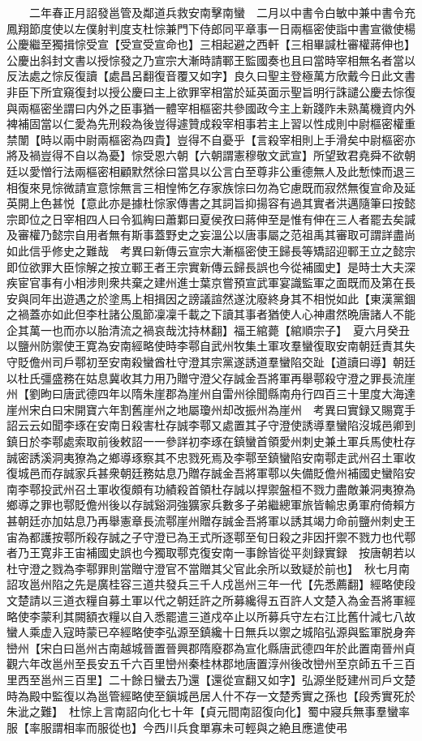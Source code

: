 　　二年春正月詔發邕管及鄰道兵救安南擊南蠻　二月以中書令白敏中兼中書令充鳳翔節度使以左僕射判度支杜悰兼門下侍郎同平章事一日兩樞密使詣中書宣徽使楊公慶繼至獨揖悰受宣【受宣受宣命也】三相起避之西軒【三相畢諴杜審權蔣伸也】公慶出斜封文書以授悰發之乃宣宗大漸時請鄆王監國奏也且曰當時宰相無名者當以反法處之悰反復讀【處昌呂翻復音覆又如字】良久曰聖主登極萬方欣戴今日此文書非臣下所宜窺復封以授公慶曰主上欲罪宰相當於延英面示聖旨明行誅譴公慶去悰復與兩樞密坐謂曰内外之臣事猶一體宰相樞密共參國政今主上新踐阼未熟萬機資内外裨補固當以仁愛為先刑殺為後豈得遽贊成殺宰相事若主上習以性成則中尉樞密權重禁闈【時以兩中尉兩樞密為四貴】豈得不自憂乎【言殺宰相則上手滑矣中尉樞密亦將及禍豈得不自以為憂】悰受恩六朝【六朝謂憲穆敬文武宣】所望致君堯舜不欲朝廷以愛憎行法兩樞密相顧默然徐曰當具以公言白至尊非公重德無人及此慙悚而退三相復來見悰微請宣意悰無言三相惶怖乞存家族悰曰勿為它慮既而寂然無復宣命及延英開上色甚悦【意此亦是據杜悰家傳書之其詞旨抑揚容有過其實者洪邁隨筆曰按懿宗即位之日宰相四人曰令狐綯曰蕭鄴曰夏侯孜曰蔣伸至是惟有伸在三人者罷去矣諴及審權乃懿宗自用者無有斯事蓋野史之妄溫公以唐事屬之范祖禹其審取可謂詳盡尚如此信乎修史之難哉　考異曰新傳云宣宗大漸樞密使王歸長等矯詔迎鄆王立之懿宗即位欲罪大臣悰解之按立鄆王者王宗實新傳云歸長誤也今從補國史】是時士大夫深疾宦官事有小相涉則衆共棄之建州進士葉京嘗預宣武軍宴識監軍之面既而及第在長安與同年出遊遇之於塗馬上相揖因之謗議諠然遂沈廢終身其不相悦如此【東漢黨錮之禍蓋亦如此但李杜諸公風節凜凜千載之下讀其事者猶使人心神肅然晩唐諸人不能企其萬一也而亦以胎清流之禍哀哉沈持林翻】福王綰薨【綰順宗子】　夏六月癸丑以鹽州防禦使王寛為安南經略使時李鄠自武州牧集土軍攻羣蠻復取安南朝廷責其失守貶儋州司戶鄠初至安南殺蠻酋杜守澄其宗黨遂誘道羣蠻陷交趾【道讀曰導】朝廷以杜氏彊盛務在姑息冀收其力用乃贈守澄父存誠金吾將軍再舉鄠殺守澄之罪長流崖州【劉昫曰唐武德四年以隋朱崖郡為崖州自雷州徐聞縣南舟行四百三十里度大海達崖州宋白曰宋開寶六年割舊崖州之地屬瓊州却改振州為崖州　考異曰實録又賜寛手詔云云如聞李琢在安南日殺害杜存誠李鄠又處置其子守澄使誘導羣蠻陷沒城邑卿到鎮日於李鄠處索取前後敕詔一一參詳初李琢在鎮蠻首領愛州刺史兼土軍兵馬使杜存誠密誘溪洞夷獠為之鄉導琢察其不忠戮死焉及李鄠至鎮蠻陷安南鄠走武州召土軍收復城邑而存誠家兵甚衆朝廷務姑息乃贈存誠金吾將軍鄠以失備貶儋州補國史蠻陷安南李鄠投武州召土軍收復頗有功績殺首領杜存誠以捍禦盤桓不戮力盡敵兼洞夷獠為鄉導之罪也鄠貶儋州後以存誠谿洞強獷家兵數多子弟繼總軍旅皆輸忠勇軍府倚賴方甚朝廷亦加姑息乃再舉憲章長流鄠崖州贈存誠金吾將軍以誘其竭力命前鹽州刺史王宙為都護按鄠所殺存誠之子守澄已為王式所逐鄠至旬日殺之非因扞禦不戮力也代鄠者乃王寛非王宙補國史誤也今獨取鄠克復安南一事餘皆從平剡録實録　按唐朝若以杜守澄之戮為李鄠罪則當贈守澄官不當贈其父官此余所以致疑於前也】　秋七月南詔攻邕州陷之先是廣桂容三道共發兵三千人戍邕州三年一代【先悉薦翻】經略使段文楚請以三道衣糧自募土軍以代之朝廷許之所募纔得五百許人文楚入為金吾將軍經略使李蒙利其闕額衣糧以自入悉罷遣三道戍卒止以所募兵守左右江比舊什減七八故蠻人乘虚入寇時蒙已卒經略使李弘源至鎮纔十日無兵以禦之城陷弘源與監軍脱身奔巒州【宋白曰邕州古南越城晉置晉興郡隋廢郡為宣化縣唐武德四年於此置南晉州貞觀六年改邕州至長安五千六百里巒州秦桂林郡地唐置淳州後改巒州至京師五千三百里西至邕州三百里】二十餘日蠻去乃還【還從宣翻又如字】弘源坐貶建州司戶文楚時為殿中監復以為邕管經略使至鎭城邑居人什不存一文楚秀實之孫也【段秀實死於朱泚之難】　杜悰上言南詔向化七十年【貞元間南詔復向化】蜀中寢兵無事羣蠻率服【率服謂相率而服從也】今西川兵食單寡未可輕與之絶且應遣使弔